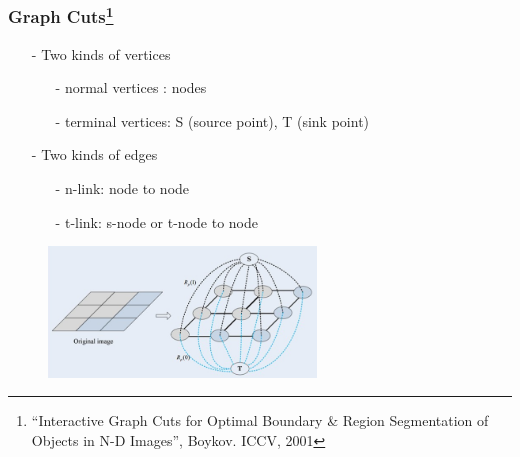 \documentclass[notheorems,mathserif,table,compress]{beamer}  %
\begin{document}
\begin{frame}
\frametitle{Graph Cuts\footnote{``Interactive Graph Cuts for Optimal Boundary \& Region Segmentation of Objects in N-D Images'', Boykov. ICCV, 2001}}
\begin{itemize}
\item[-] Two kinds of {\color{blue} vertices} 
	\begin{itemize}
	\item[-] {\color{blue} normal} vertices : nodes
	\item[-] {\color{blue} terminal} vertices: S (source point), T (sink point)
	\end{itemize}
\item[-] Two kinds of {\color{blue} edges}
	\begin{itemize}
	\item[-] {\color{blue} n-link}: node to node
	\item[-] {\color{blue} t-link}: s-node or t-node to node
	\end{itemize}
\end{itemize}
\begin{figure}[!ht]
    \centering
    \includegraphics[width=2.8in]{graph_cut}
\end{figure}
\end{frame}
\end{document}
